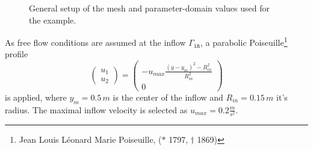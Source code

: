 \documentclass{article}
\begin{document}
\begin{figure}[!ht]
        \caption{General setup of the mesh and parameter-domain values used for the example.}\label{fig:example_params}
\end{figure}

As free flow conditions are assumed at the inflow $\Gamma_{\texttt{in}}$, a parabolic Poiseuille\footnote{Jean Louis Léonard Marie Poiseuille, ($\ast$ 1797, $\dag$ 1869)} profile
\begin{equation} 
\begin{pmatrix}
u_1\\
u_2
\end{pmatrix}
=
\begin{pmatrix}
-u_{max} \frac{(y-y_m)^2-R_{in}^2}{R_{in}^2}\\
0
\end{pmatrix}
\end{equation}
is applied, where $y_m=0.5\,m$ is the center of the inflow and $R_{in}=0.15\,m$ it's radius. The maximal inflow velocity is selected as $u_{max}=0.2\frac{m}{s^2}$.
\end{document}
